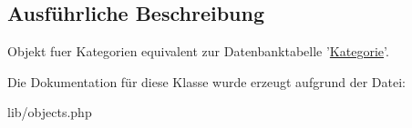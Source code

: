 \subsection{\-Ausführliche \-Beschreibung}
\-Objekt fuer \-Kategorien equivalent zur \-Datenbanktabelle '\hyperlink{classKategorie}{\-Kategorie}'. 

\-Die \-Dokumentation für diese \-Klasse wurde erzeugt aufgrund der \-Datei\-:\begin{DoxyCompactItemize}
\item 
lib/objects.\-php\end{DoxyCompactItemize}
